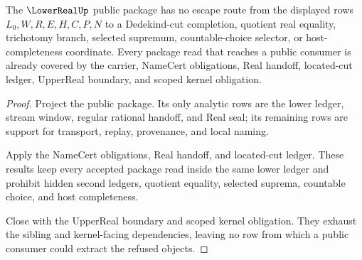 \begin{theorem}
\label{thm:lowerreal-public-nonescape}
The $\LowerRealUp$ public package has no escape route from the displayed rows $L_0,W,R,E,H,C,P,N$ to a Dedekind-cut completion, quotient real equality, trichotomy branch, selected supremum, countable-choice selector, or host-completeness coordinate. Every package read that reaches a public consumer is already covered by the carrier, NameCert obligations, Real handoff, located-cut ledger, UpperReal boundary, and scoped kernel obligation.
\end{theorem}
\begin{proof}
Project the public package. Its only analytic rows are the lower ledger, stream window, regular rational handoff, and Real seal; its remaining rows are support for transport, replay, provenance, and local naming.

Apply the NameCert obligations, Real handoff, and located-cut ledger. These results keep every accepted package read inside the same lower ledger and prohibit hidden second ledgers, quotient equality, selected suprema, countable choice, and host completeness.

Close with the UpperReal boundary and scoped kernel obligation. They exhaust the sibling and kernel-facing dependencies, leaving no row from which a public consumer could extract the refused objects.
\end{proof}

